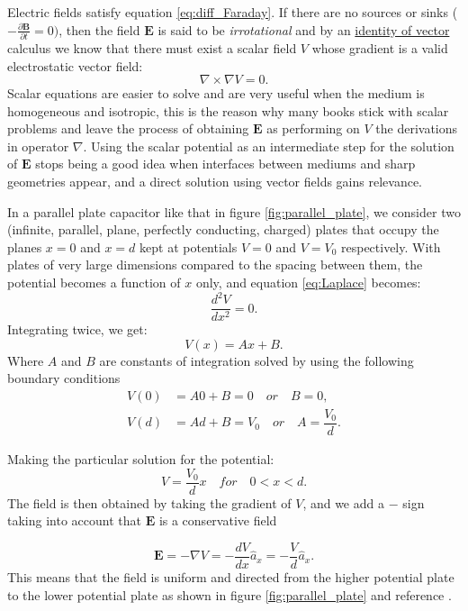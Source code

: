 Electric fields satisfy equation \ref{eq:diff_Faraday}. If there are no sources or sinks ($- \frac{\partial \mathbf{B}}{\partial t}=0)$, then the field $\mathbf{E}$ is said to be \textit{irrotational} and by an \href{http://ebooksgo.org/mathematics/Vector_Identity.pdf}{identity of vector} calculus we know that there must exist a scalar field $V$ whose gradient is a valid electrostatic vector field:
\begin{equation}
\nabla\times\nabla V = 0.
\label{eq:Laplace}
\end{equation}
Scalar equations are easier to solve and are very useful when the medium is homogeneous and isotropic, this is the reason why many books stick with scalar problems and leave the process of obtaining $\mathbf{E}$ as performing on $V$ the derivations in operator $\nabla$. Using the scalar potential as an intermediate step for the solution of $\mathbf{E}$ stops being a good idea when interfaces between mediums and sharp geometries appear, and a direct solution using vector fields gains relevance.

In a parallel plate capacitor like that in figure \ref{fig:parallel_plate}, we consider two (infinite, parallel, plane, perfectly conducting, charged) plates that occupy the planes $x = 0$ and $x = d$ kept at potentials $V = 0$ and $V = V_0$ respectively.  
With plates of very large dimensions compared to the spacing between them, the potential becomes a function of $x$ only, and equation \ref{eq:Laplace} becomes:
$$\dfrac{d^2V}{d x^2}=0.$$ Integrating twice, we get: 
\begin{equation}
V(x) = Ax + B.
\end{equation}
Where $A$  and $B$ are constants of integration solved by using the following boundary conditions
\begin{align*}
V(0) &= A0 + B = 0 \quad or \quad B = 0,\\
V(d) &= Ad + B = V_0 \quad or \quad A = \dfrac{V_0}{d}.
\end{align*}

Making the particular solution for the potential:
$$V=\dfrac{V_0}{d}x \quad for \quad 0<x<d.$$ 
The field is then obtained by taking the gradient of $V$, and we add a $-$ sign taking into account that $\mathbf{E}$ is a conservative field

\begin{equation}
\mathbf{E}= -\nabla V = - \dfrac{dV}{dx}\hat{a}_x = -\dfrac{V}{d}\hat{a}_x.
\end{equation}
This means that the field is uniform and directed from the higher potential plate to the lower potential plate as shown in figure  \ref{fig:parallel_plate} and reference \cite{Rao2004}.

